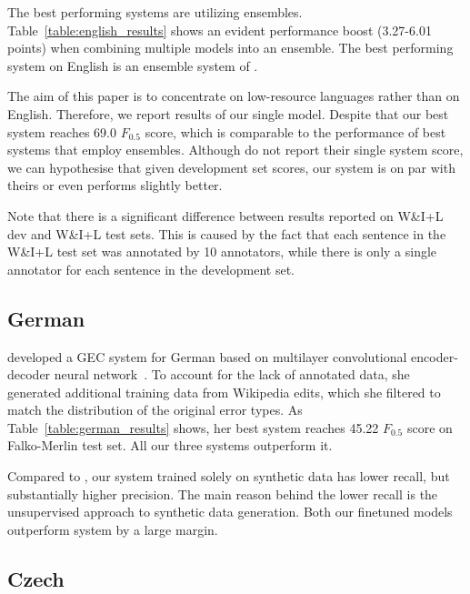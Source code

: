\documentclass[11pt,a4paper]{article}
\begin{document}
The best performing systems are utilizing ensembles. Table~\ref{table:english_results} shows an evident performance boost (3.27-6.01 points) when combining multiple models into an ensemble. The best performing system on English is an ensemble system of .

The aim of this paper is to concentrate on low-resource languages rather than on English. Therefore, we report results of our single model. Despite that our best system reaches 69.0 $F_{0.5}$ score, which is comparable to the performance of best systems that employ ensembles. Although  do not report their single system score, we can hypothesise that given development set scores, our system is on par with theirs or even performs slightly better.

Note that there is a significant difference between results reported on W\&I+L dev and W\&I+L test sets. This is caused by the fact that each sentence in the W\&I+L test set was annotated by 10 annotators, while there is only a single annotator for each sentence in the development set. 

 
\subsection{German}

 developed a GEC system for German based on multilayer convolutional encoder-decoder neural network~\cite{chollampatt2018mlconv}. To account for the lack of annotated data, she generated additional training data from Wikipedia edits, which she filtered to match the distribution of the original error types. As Table~\ref{table:german_results} shows, her best system reaches 45.22 $F_{0.5}$ score on Falko-Merlin test set. All our three systems outperform it.

Compared to , our system trained solely on synthetic data has lower recall, but substantially higher precision. The main reason behind the lower recall is the unsupervised approach to synthetic data generation. Both our finetuned models outperform  system by a large margin.

\subsection{Czech}
\end{document}
